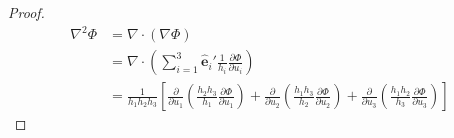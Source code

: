 \documentclass[12pt]{article}
\newenvironment{problem}[2][Problem]{\begin{trivlist}
\item[\hskip \labelsep {\bfseries #1}\hskip \labelsep {\bfseries #2.}]}{\end{trivlist}}
\begin{document}
\begin{problem}{2.c}
\end{problem}
\begin{proof}
\begin{align*}
	\nabla^2 \Phi &= \nabla \cdot (\nabla \Phi) \\
	&= \nabla \cdot \left( \sum_{i=1}^3 \hat{\mathbf{e}}_i' \frac{1}{h_i}
		\frac{\partial \Phi}{\partial u_i} \right) \\
	&= \frac{1}{h_1h_2h_3} \left[
		\frac{\partial}{\partial u_1} \left( \frac{h_2h_3}{h_1} \frac{\partial
		\Phi}{\partial u_1} \right)
		+ \frac{\partial}{\partial u_2} \left( \frac{h_1h_3}{h_2} \frac{\partial
		\Phi}{\partial u_2} \right)
		+ \frac{\partial}{\partial u_3} \left( \frac{h_1h_2}{h_3} \frac{\partial
		\Phi}{\partial u_3} \right) \right]
\end{align*}
\end{proof}
\filbreak
\end{document}
